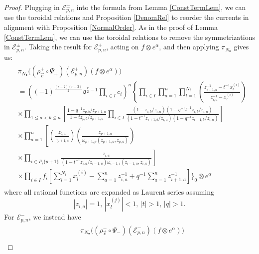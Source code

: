 \documentclass{amsart}
\newcommand{\ddd}{\mathfrak{d}}
\theoremstyle{remark}
\numberwithin{thm}{section}
\numberwithin{equation}{section}
\begin{document}
\begin{proof}
Plugging in $\mathcal{E}_{p,n}^\pm$ into the formula from Lemma \ref{ConstTermLem}, we can use the toroidal relations and Proposition \ref{DenomRel} to reorder the currents in alignment with Proposition \ref{NormalOrder}.
As in the proof of Lemma \ref{ConstTermLem}, we can use the toroidal relations to remove the symmetrizations in $\mathcal{E}_{p,n}^\pm$.
Taking the result for $\mathcal{E}_{p,n}^+$, acting on $f\otimes e^\alpha$, and then applying $\pi_{N_\bullet}$ gives us:
\begin{align*}
\begin{split}
&\pi_{N_\bullet}\biggl( (\rho_{\vec{c}}^+\circ\Psi_+)(\mathcal{E}_{p,n}^+)(f\otimes e^\alpha)\biggr)\\
&=\left( (-1)^{\frac{(r-2)(r-3)}{2}}\ddd^{\frac{r}{2}-1}\prod_{i\in I} c_i\right)^n
\left\{\prod_{i\in I}\prod_{a=1}^n\prod_{l=1}^{N_i}\left(\frac{ z_{i+1,a}^{-1}-t^{-1}x_{l}^{(i)} }{ z_{i,a}^{-1}-x_{l}^{(i)} }\right)\right.\\
&\times\prod_{1\le a<b\le n}
\left[ 
\frac{1-q^{-1}z_{p,b}/z_{p+1,a}}{1-tz_{p,b}/z_{p+1,a}} \prod_{i\in I}
\frac{\left(1-z_{i,b}/z_{i,a}\right)\left(1-q^{-1}t^{-1}z_{i,b}/z_{i,a}\right)}{\left(1-t^{-1}z_{i+1,b}/z_{i,a}\right)\left(1-q^{-1}z_{i-1,b}/z_{i,a}\right)}
\right]\\
&\times\prod_{a=1}^n
\left[\left(\frac{z_{0,a}}{z_{p+1,a}}\right)\left(\frac{z_{p+1,a}}{\omega_{p+1,p}(z_{p+1,a},z_{p,a})}\right)\right.\\
&\times\left.\prod_{i\in I\setminus\{p+1\}}
\frac{z_{i,a}}{\left(1-t^{-1}z_{i,a}/z_{i-1,a}\right)\omega_{i-1,i}(z_{i-1,a},z_{i,a})}\right]\\
&\times \prod_{i\in I}f_i\left[  \sum_{l=1}^{N_i}x_{l}^{(i)}-\sum_{a=1}^nz_{i,a}^{-1}+q^{-1}\sum_{a=1}^n z_{i+1,a}^{-1} \right]\Bigg\}_0\otimes e^\alpha
\end{split}
\end{align*}
where all rational functions are expanded as Laurent series assuming
\begin{equation}
|z_{i,a}|=1,\,
|x_{l}^{(j)}|<1,\,
|t|>1,\,
|q|>1.   
\label{EExpand}
\end{equation}
For $\mathcal{E}_{p,n}^-$, we instead have
\begin{align*}
\begin{split}
&\pi_{N_\bullet}\biggl((\rho_{\vec{c}}^-\circ\Psi_-)(\mathcal{E}_{p,n}^-) (f\otimes e^\alpha)\biggr)\\

\end{split}
\end{align*}
\end{proof}
\end{document}
